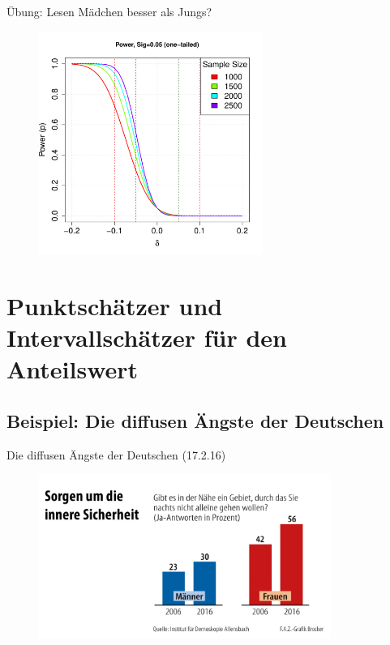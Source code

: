 \documentclass[usenames,dvipsnames,handout]{beamer}
\begin{document}
\begin{frame}{Übung: Lesen Mädchen besser als Jungs? }
  \begin{figure}[ht]
 	\centering
 	      \includegraphics[width=0.65\textwidth]{powerPisa.pdf}%
 	\end{figure}
\end{frame}

\section{Punktschätzer und Intervallschätzer für den Anteilswert}
\subsection{Beispiel: Die diffusen Ängste der Deutschen}
\begin{frame}{Die diffusen Ängste der Deutschen (17.2.16)}
  \begin{figure}[ht]
 	\centering
 	      \includegraphics[width=0.85\textwidth]{sorgen.jpg}%
 	\end{figure}
\end{frame}
\end{document}
